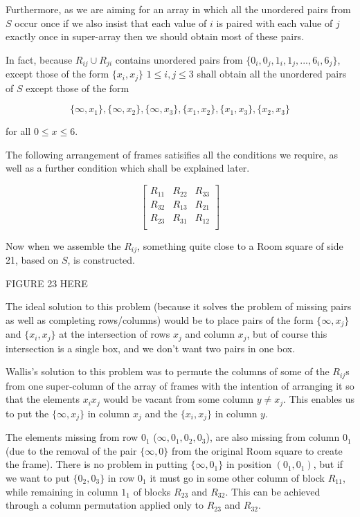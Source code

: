 \documentclass[11pt, a4paper]{book}\usepackage[]{graphicx}\usepackage[]{xcolor}
\newcounter{example}
\begin{document}
\begin{example}
Furthermore, as we are aiming for an array in which all the
unordered pairs from $S$ occur once if we also insist that
each value of $i$ is paired with each value of $j$ exactly
once in super-array then we should obtain most of these
pairs.

In fact, because $R_{ij} \cup R_{ji}$ contains
unordered pairs from $\{0_i,0_j,1_i,1_j,...,6_i,6_j\}$,
except those of the form $\{x_i,x_j\}$ $1 \leq i,j \leq 3$
shall obtain all the unordered pairs of $S$ except those of
the form

\begin{equation}
\{\infty, x_1\}, \{\infty, x_2\}, \{\infty, x_3\}, \{x_1, x_2\}, \{x_1, x_3\}, \{x_2, x_3\}
\end{equation}

for all $0 \leq x \leq 6$.

The following arrangement of frames satisifies all the
conditions we require, as well as a further condition which
shall be explained later.

\begin{equation}
  \begin{bmatrix}
    R_{11} & R_{22} & R_{33} \\
    R_{32} & R_{13} & R_{21} \\
    R_{23} & R_{31} & R_{12} \\
  \end{bmatrix}
\end{equation}

Now when we assemble the $R_{ij}$, something quite close to
a Room square of side 21, based on $S$, is constructed.

FIGURE 23 HERE

\end{example}

The ideal solution to this problem
(because it solves the problem of missing pairs as well as
completing rows/columns) would be to place pairs of the form
$\{\infty, x_j\}$ and $\{x_i, x_j\}$ at the intersection of
rows $x_j$ and column $x_j$, but of course this intersection
is a single box, and we don’t want two pairs in one box.

Wallis’s solution to this problem was to permute the columns
of some of the $R_{ij}$s from one super-column of the array
of frames with the intention of arranging it so that the
elements $x_i x_j$ would be vacant from some column
$y \neq x_j$. This enables us to put the $\{\infty, x_j\}$ in
column $x_j$ and the $\{x_i,x_j\}$ in column $y$.

The elements missing from row $0_1$ ($\infty, 0_1, 0_2, 0_3$),
are also missing from column $0_1$ (due to the removal
of the pair $\{\infty,0\}$ from the original Room square to
create the frame). There is no problem in putting
$\{\infty,0_1\}$ in position $(0_1,0_1)$, but if we want to
put $\{0_2,0_3\}$ in row $0_1$ it must go in some other
column of block $R_{11}$, while remaining in column $1_1$ of
blocks $R_{23}$ and $R_{32}$. This can be achieved through a
column permutation applied only to $R_{23}$ and $R_{32}$.
\end{document}

